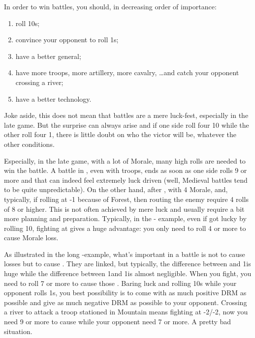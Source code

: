 \begin{playtip}
  In order to win battles, you should, in decreasing order of importance:
  \begin{enumerate}
  \item roll 10s;
  \item convince your opponent to roll 1s;
  \item have a better general;
  \item have more troops, more artillery, more cavalry, \ldots and catch your
    opponent crossing a river;
  \item have a better technology.
  \end{enumerate}
  Joke aside, this does not mean that battles are a mere luck-fest, especially
  in the late game. But the surprise can always arise and if one side roll
  four 10 while the other roll four 1, there is little doubt on who the victor
  will be, whatever the other conditions.

  Especially, in the late game, with a lot of Morale, many high rolls are
  needed to win the battle. A battle in \TMED, even with 
  troops, ends as soon as one side rolls 9 or more and that can indeed feel
  extremely luck driven (well, Medieval battles tend to be quite
  unpredictable). On the other hand, after \TMUS, with 4 Morale, and,
  typically, if rolling at -1 because of Forest, then routing the enemy
  require 4 rolls of 8 or higher. This is not often achieved by mere luck and
  usually require a bit more planning and preparation. Typically, in the
  \SUE- example, even if \SUE got lucky by rolling 10,
  fighting at  gives a huge advantage: you only need to roll 4 or
  more to cause Morale loss.

  As illustrated in the long \FRA-\HIS example, what's important in a battle
  is not to cause losses but to cause \textetoile. They are linked, but
  typically, the difference between \texttd and 1\textetoile is huge while the
  difference between 1\textetoile and 1\texttu\textetoile is almost
  negligible. When you fight, you need to roll 7 or more to cause those
  \textetoile. Baring luck and rolling 10s while your opponent rolls 1s, you
  best possibility is to come with as much positive DRM as possible and give
  as much negative DRM as possible to your opponent. Crossing a river to
  attack a troop stationed in Mountain means fighting at -2/-2, now you need 9
  or more to cause \textetoile while your opponent need 7 or more. A pretty
  bad situation.
\end{playtip}

